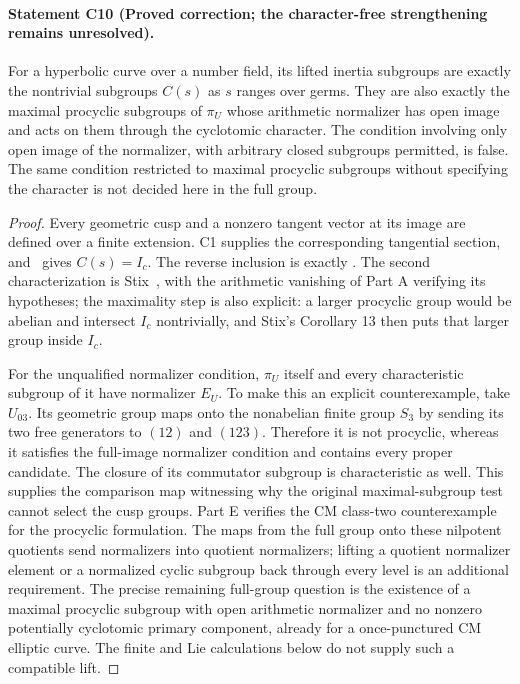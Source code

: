 \paragraph{Statement C10 (Proved correction; the character-free strengthening remains unresolved).}\label{res:C10}
For a hyperbolic curve over a number field, its lifted inertia subgroups are exactly the nontrivial subgroups $C(s)$ as $s$ ranges over germs. They are also exactly the maximal procyclic subgroups of $\pi_U$ whose arithmetic normalizer has open image and acts on them through the cyclotomic character. The condition involving only open image of the normalizer, with arbitrary closed subgroups permitted, is false. The same condition restricted to maximal procyclic subgroups without specifying the character is not decided here in the full group.
\begin{proof}
Every geometric cusp and a nonzero tangent vector at its image are defined over a finite extension. C1 supplies the corresponding tangential section, and \Rtwo\ gives $C(s)=I_c$. The reverse inclusion is exactly \Rtwo. The second characterization is Stix~\cite[Theorem 20 and Corollary 21]{Stix2008}, with the arithmetic vanishing of Part A verifying its hypotheses; the maximality step is also explicit: a larger procyclic group would be abelian and intersect $I_c$ nontrivially, and Stix's Corollary 13 then puts that larger group inside $I_c$.

For the unqualified normalizer condition, $\pi_U$ itself and every characteristic subgroup of it have normalizer $E_U$. To make this an explicit counterexample, take $U_{03}$. Its geometric group maps onto the nonabelian finite group $S_3$ by sending its two free generators to $(12)$ and $(123)$. Therefore it is not procyclic, whereas it satisfies the full-image normalizer condition and contains every proper candidate. The closure of its commutator subgroup is characteristic as well. This supplies the comparison map witnessing why the original maximal-subgroup test cannot select the cusp groups. Part E verifies the CM class-two counterexample for the procyclic formulation. The maps from the full group onto these nilpotent quotients send normalizers into quotient normalizers; lifting a quotient normalizer element or a normalized cyclic subgroup back through every level is an additional requirement. The precise remaining full-group question is the existence of a maximal procyclic subgroup with open arithmetic normalizer and no nonzero potentially cyclotomic primary component, already for a once-punctured CM elliptic curve. The finite and Lie calculations below do not supply such a compatible lift.
\end{proof}
